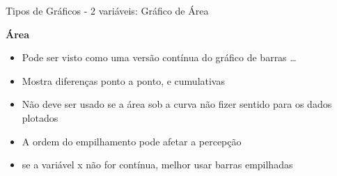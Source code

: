 \documentclass{beamer}\usepackage[]{graphicx}\usepackage[]{color}
\begin{document}
\begin{frame}{Tipos de Gráficos - 2 variáveis: Gráfico de Área}
  
\textbf{Área}
  
\begin{itemize}
  \item Pode ser visto como uma versão contínua do gráfico de barras \ldots \pause
  \vfill
  \item Mostra diferenças ponto a ponto, e cumulativas
  \vfill
  \item Não deve ser usado se a área sob a curva não fizer sentido para os dados plotados \pause
  \vfill
  \item A ordem do empilhamento pode afetar a percepção \pause
  \vfill
  \item se a variável x não for contínua, melhor usar barras empilhadas \pause
  
\end{itemize}

\end{frame} 
\end{document}
